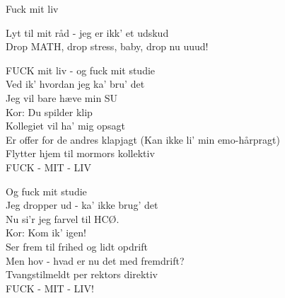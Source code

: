 \begin{song}{Fuck mit liv}
  \begin{SBSection*}
Lyt til mit råd - jeg er ikk' et udskud\\
Drop MATH, drop stress, baby, drop nu uuud!
  \end{SBSection*}

  \begin{SBChorus}
FUCK mit liv - og fuck mit studie\\
Ved ik' hvordan jeg ka' bru' det\\
Jeg vil bare hæve min SU\\
Kor: Du spilder klip\\
Kollegiet vil ha' mig opsagt\\
Er offer for de andres klapjagt (Kan ikke li' min emo-hårpragt)\\
Flytter hjem til mormors kollektiv\\
FUCK - MIT - LIV
  \end{SBChorus}

  \begin{SBChorus}
Og fuck mit studie\\
Jeg dropper ud - ka' ikke brug' det\\
Nu si'r jeg farvel til HCØ.\\
Kor: Kom ik' igen!\\
Ser frem til frihed og lidt opdrift\\
Men hov - hvad er nu det med fremdrift?\\
Tvangstilmeldt per rektors direktiv\\
FUCK - MIT - LIV!
  \end{SBChorus}
\end{song}